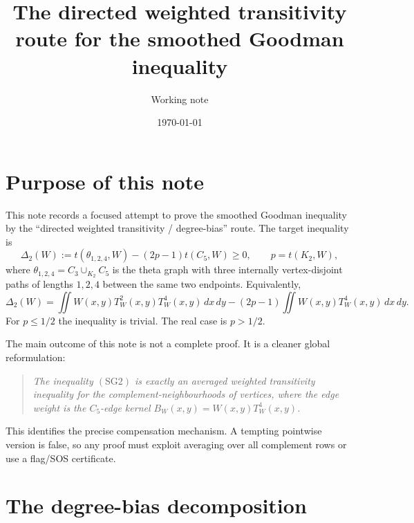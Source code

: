 \documentclass[11pt]{article}
\title{The directed weighted transitivity route for the smoothed Goodman inequality}
\author{Working note}
\date{\today}
\newcommand{\dd}{\,d}
\newcommand{\DeltaTwo}{\Delta_2}
\begin{document}
\maketitle

\section{Purpose of this note}

This note records a focused attempt to prove the smoothed Goodman inequality by the
``directed weighted transitivity / degree-bias'' route.  The target inequality is
\begin{equation}
\DeltaTwo(W)
:=t(\theta_{1,2,4},W)-(2p-1)t(C_5,W)\ge 0,
\qquad p=t(K_2,W),
\tag{SG2}
\end{equation}
where \(\theta_{1,2,4}=C_3\cup_{K_2}C_5\) is the theta graph with three internally
vertex-disjoint paths of lengths \(1,2,4\) between the same two endpoints.
Equivalently,
\begin{equation}
\DeltaTwo(W)
=\iint W(x,y)T_W^2(x,y)T_W^4(x,y)\dd x\dd y
 -(2p-1)\iint W(x,y)T_W^4(x,y)\dd x\dd y .
\end{equation}
For \(p\le 1/2\) the inequality is trivial.  The real case is \(p>1/2\).

The main outcome of this note is not a complete proof.  It is a cleaner global
reformulation:
\begin{quote}
\emph{The inequality \((\mathrm{SG2})\) is exactly an averaged weighted
transitivity inequality for the complement-neighbourhoods of vertices, where the
edge weight is the \(C_5\)-edge kernel \(B_W(x,y)=W(x,y)T_W^4(x,y)\).}
\end{quote}
This identifies the precise compensation mechanism.  A tempting pointwise
version is false, so any proof must exploit averaging over all complement rows
or use a flag/SOS certificate.

\section{The degree-bias decomposition}
\end{document}
